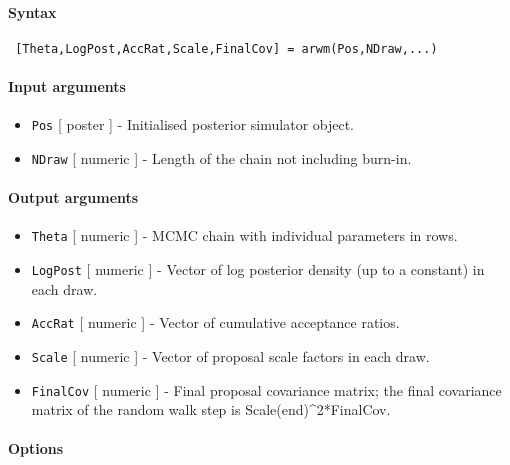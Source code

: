 


	\paragraph{Syntax}
 
 \begin{verbatim}
 [Theta,LogPost,AccRat,Scale,FinalCov] = arwm(Pos,NDraw,...)
 \end{verbatim}
 
 \paragraph{Input arguments}
 
 \begin{itemize}
 \item
   \texttt{Pos} {[} poster {]} - Initialised posterior simulator object.
 \item
   \texttt{NDraw} {[} numeric {]} - Length of the chain not including
   burn-in.
 \end{itemize}
 
 \paragraph{Output arguments}
 
 \begin{itemize}
 \item
   \texttt{Theta} {[} numeric {]} - MCMC chain with individual parameters
   in rows.
 \item
   \texttt{LogPost} {[} numeric {]} - Vector of log posterior density (up
   to a constant) in each draw.
 \item
   \texttt{AccRat} {[} numeric {]} - Vector of cumulative acceptance
   ratios.
 \item
   \texttt{Scale} {[} numeric {]} - Vector of proposal scale factors in
   each draw.
 \item
   \texttt{FinalCov} {[} numeric {]} - Final proposal covariance matrix;
   the final covariance matrix of the random walk step is
   Scale(end)\^{}2*FinalCov.
 \end{itemize}
 
 \paragraph{Options}
 
